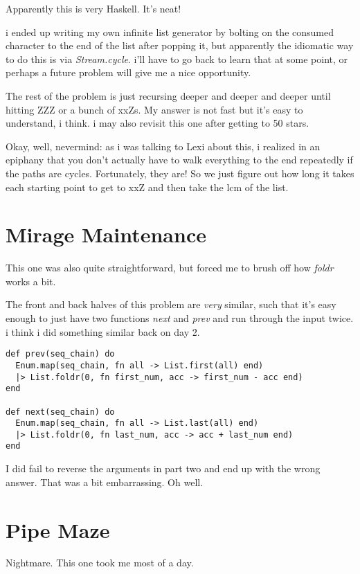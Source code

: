 \documentclass{article}
\begin{document}
Apparently this is very Haskell. It's neat!

i ended up writing my own infinite list generator by bolting on the consumed character to the end of the list after popping it, but apparently the idiomatic way to do this is via \textit{Stream.cycle}. i'll have to go back to learn that at some point, or perhaps a future problem will give me a nice opportunity.

The rest of the problem is just recursing deeper and deeper and deeper until hitting ZZZ or a bunch of xxZs. My answer is not fast but it's easy to understand, i think. i may also revisit this one after getting to 50 stars.

Okay, well, nevermind: as i was talking to Lexi about this, i realized in an epiphany that you don't actually have to walk everything to the end repeatedly if the paths are cycles. Fortunately, they are! So we just figure out how long it takes each starting point to get to xxZ and then take the lcm of the list.

\section{Mirage Maintenance}

This one was also quite straightforward, but forced me to brush off how \textit{foldr} works a bit.

The front and back halves of this problem are \textit{very} similar, such that it's easy enough to just have two functions \textit{next} and \textit{prev} and run through the input twice. i think i did something similar back on day 2.

\begin{verbatim}
def prev(seq_chain) do
  Enum.map(seq_chain, fn all -> List.first(all) end)
  |> List.foldr(0, fn first_num, acc -> first_num - acc end)
end

def next(seq_chain) do
  Enum.map(seq_chain, fn all -> List.last(all) end)
  |> List.foldr(0, fn last_num, acc -> acc + last_num end)
end
\end{verbatim}

I did fail to reverse the arguments in part two and end up with the wrong answer. That was a bit embarrassing. Oh well.

\section{Pipe Maze}

Nightmare. This one took me most of a day.
\end{document}
